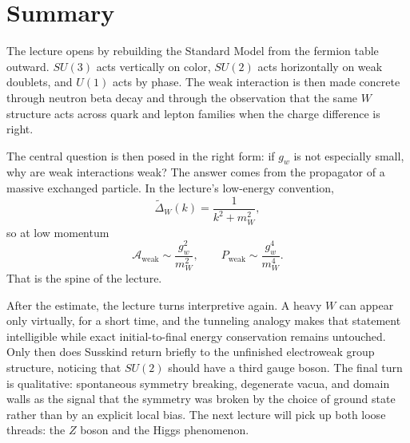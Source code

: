 \section{Summary}

The lecture opens by rebuilding the Standard Model from the fermion table outward. \(SU(3)\) acts vertically on color, \(SU(2)\) acts horizontally on weak doublets, and \(U(1)\) acts by phase. The weak interaction is then made concrete through neutron beta decay and through the observation that the same \(W\) structure acts across quark and lepton families when the charge difference is right.

The central question is then posed in the right form: if \(g_w\) is not especially small, why are weak interactions weak? The answer comes from the propagator of a massive exchanged particle. In the lecture's low-energy convention,
\[
\widetilde{\Delta}_W(k)=\frac{1}{k^2+m_W^2},
\]
so at low momentum
\[
\mathcal{A}_{\text{weak}} \sim \frac{g_w^2}{m_W^2},
\qquad
P_{\text{weak}} \sim \frac{g_w^4}{m_W^4}.
\]
That is the spine of the lecture.

After the estimate, the lecture turns interpretive again. A heavy \(W\) can appear only virtually, for a short time, and the tunneling analogy makes that statement intelligible while exact initial-to-final energy conservation remains untouched. Only then does Susskind return briefly to the unfinished electroweak group structure, noticing that \(SU(2)\) should have a third gauge boson. The final turn is qualitative: spontaneous symmetry breaking, degenerate vacua, and domain walls as the signal that the symmetry was broken by the choice of ground state rather than by an explicit local bias. The next lecture will pick up both loose threads: the \(Z\) boson and the Higgs phenomenon.